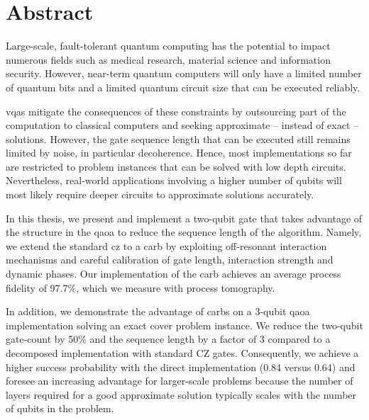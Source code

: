 \chapter{Abstract}
Large-scale, fault-tolerant quantum computing has the potential to impact numerous fields such as medical research, material science and information security. However, near-term quantum computers will only have a limited number of quantum bits and a limited quantum circuit size that can be executed reliably.

\Glspl{vqa} mitigate the consequences of these constraints by outsourcing part of the computation to classical computers and seeking approximate -- instead of exact -- solutions.  However, the gate sequence length that can be executed still remains limited by noise, in particular decoherence. Hence, most implementations so far are restricted to problem instances that can be solved with low depth circuits. Nevertheless, real-world applications involving a higher number of qubits will most likely require deeper circuits to approximate solutions accurately. 

In this thesis, we present and implement a two-qubit gate that takes advantage of the structure in the \gls{qaoa} to reduce the sequence length of the algorithm. Namely, we extend the standard \gls{cz} to a \gls{carb} by exploiting off-resonant interaction mechanisms and careful calibration of gate length, interaction strength and dynamic phases. Our implementation of the \gls{carb} achieves an average process fidelity of 97.7\%, which we measure with process tomography.

In addition, we demonstrate the advantage of \glspl{carb} on a 3-qubit \gls{qaoa} implementation solving an exact cover problem instance. We reduce the two-qubit gate-count by 50\% and the sequence length by a factor of 3 compared to a decomposed implementation with standard CZ gates. Consequently, we achieve a higher success probability with the direct implementation (0.84 versus 0.64) and foresee an increasing advantage for larger-scale problems because  the  number  of  layers  required  for a good approximate solution typically  scales with the number of  qubits in the problem.


\glsresetall{}